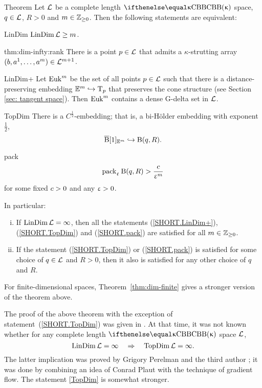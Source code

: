\begin{thm}{Theorem}\label{thm:dim-infty}
Let $\mathcal{L}$ be a complete length $\Alex{\kappa}$ space, 
$q\in \spc{L}$, 
$R>0$ 
and $m\in \ZZ_{\ge0}$.
Then the following statements are equivalent:
\begin{subthmA}{LinDim}  $\LinDim\spc{L}\ge m$.
\end{subthmA}

\begin{subthmA}{thm:dim-infty:rank}
There is a point $p\in\spc{L}$ that admits a $\kappa$-strutting array $(b,a^1,\dots,a^m)\in\spc{L}^{m+1}$.
\end{subthmA}

\begin{subthmA}{LinDim+} Let $\mathop{\rm Euk}\nolimits^m$ be the set 
of all points $p\in \spc{L}$ such that there is a distance-preserving 
embedding $\EE^m\hookrightarrow \T_p$
that preserves the cone structure 
(see Section  \ref{sec: tangent space}).
Then $\mathop{\rm Euk}\nolimits^m$  contains a dense G-delta set in $\mathcal{L}$.
\end{subthmA}

\begin{subthmA}{TopDim} There is a $C^{\frac{1}{2}}$-embedding; that is, a bi-H\"older embedding with exponent $\tfrac{1}{2}$,
\[\cBall[1]_{\EE^m}\hookrightarrow \oBall(q,R).\]
\end{subthmA}

\begin{subthmA}{pack} 
\[\mathop{\rm pack}\nolimits_\upvarepsilon \mathrm{B}{}(q,R)>\frac{c}{\upvarepsilon^m}\]
for some fixed $c>0$ and any $\upvarepsilon>0$.
\end{subthmA}

\medskip

In particular:
\begin{enumerate}[(i)]
\item If $\mathop{\rm LinDim}\nolimits\mathcal{L}=\infty$, then all the statements (\ref{SHORT.LinDim+}), (\ref{SHORT.TopDim}) and (\ref{SHORT.pack}) are satisfied for all $m\in\ZZ_{\ge0}$. 
\item 
 If the statement (\ref{SHORT.TopDim}) or (\ref{SHORT.pack}) is satisfied for some choice of $q\in \spc{L}$ and $R>0$, then it also is satisfied for any other choice of $q$ and $R$.
\end{enumerate}
\end{thm}

For finite-dimensional spaces, Theorem~\ref{thm:dim-finite} gives a stronger version 
of the theorem above.

The proof of the above theorem with the exception of  statement~(\ref{SHORT.TopDim}) was given in \cite{plaut:dimension}.
At that time, it was not known whether for any complete length $\Alex\kappa$ space $\mathcal{L}$,
\[\mathop{\rm LinDim}\nolimits\mathcal{L}=\infty\quad \Rightarrow\quad \mathop{\rm TopDim}\nolimits\mathcal{L}=\infty.\]
The latter implication was proved by Grigory Perelman and the third author \cite{perelman-petrunin:qg};
it was done by combining an idea of Conrad Plaut with the technique of gradient flow.
The statement \ref{TopDim} is somewhat stronger.


